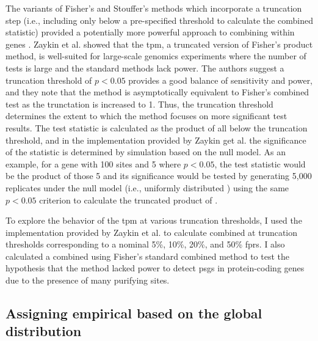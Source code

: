 The variants of Fisher's and Stouffer's methods which incorporate a
truncation step (i.e., including only \pvs below a pre-specified
threshold to calculate the combined statistic) provided a potentially
more powerful approach to combining \sw \pvs within genes
\citep{Darlington2000,Zaykin2002,Zaykin2007}. Zaykin et
al. \citeyearpar{Zaykin2002,Zaykin2007} showed that the \ac{tpm}, a
truncated version of Fisher's product method, is well-suited for
large-scale genomics experiments where the number of tests is large
and the standard methods lack power. The authors suggest a truncation
threshold of $p<0.05$ provides a good balance of sensitivity and
power, and they note that the method is asymptotically equivalent to
Fisher's combined test as the \pv trunctation is increased to
1. Thus, the truncation threshold determines the extent to which the
method focuses on more significant test results. The test statistic is
calculated as the product of all \pvs below the truncation
threshold, and in the implementation provided by Zaykin get
al. \citeyearpar{Zaykin2002} the significance of the statistic is
determined by simulation based on the null model. As an example, for a
gene with 100 sites and 5 where $p<0.05$, the test statistic would be
the product of those 5 \pvs and its significance would be tested
by generating 5,000 replicates under the null model (i.e., uniformly
distributed \pvs) using the same $p<0.05$ criterion to calculate
the truncated product of \pvs.

To explore the behavior of the \ac{tpm} at various \pv truncation
thresholds, I used the implementation provided by Zaykin et
al. \citeyearpar{Zaykin2002} to calculate combined \pvs at
truncation thresholds corresponding to a nominal 5\%, 10\%, 20\%, and
50\% \sw \acp{fpr}. I also calculated a combined \pv using
Fisher's standard combined method to test the hypothesis that the
method lacked power to detect \acp{psg} in protein-coding genes due to
the presence of many purifying sites.

\subsection{Assigning empirical \pvs based on the global \sw distribution}

